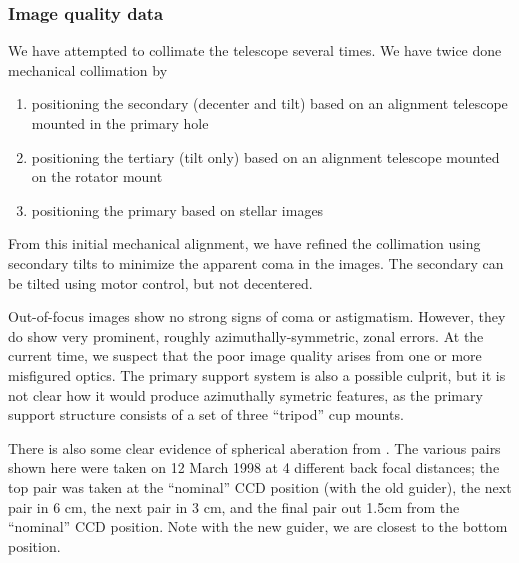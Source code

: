 \documentclass{article}[12pt]
\begin{document}
\subsubsection{Image quality data}

We have attempted to collimate the telescope several times. We have
twice done mechanical collimation by 
\begin{enumerate}
\item positioning the secondary (decenter and tilt) based on an alignment 
telescope mounted in the primary hole
\item positioning the tertiary (tilt only) based on an alignment telescope
mounted on the rotator mount
\item positioning the primary based on stellar images
\end{enumerate}

From this initial mechanical alignment, we have refined the collimation
using secondary tilts to minimize the apparent coma in the images. 
The secondary can be tilted using motor control, but not decentered.


Out-of-focus images show no strong signs of coma or astigmatism. However,
they do show very prominent, roughly azimuthally-symmetric, zonal
errors. At the current time, we suspect that the poor image quality
arises from one or more misfigured optics. The primary support system 
is also a possible culprit, but it is not clear how it would produce
azimuthally symetric features, as the primary support structure consists
of a set of three ``tripod'' cup mounts.

There is also some clear evidence of spherical aberation from 
. 
 The various
pairs shown here were taken on 12 March 1998 
at 4 different back focal distances; the
top pair was taken at the ``nominal'' CCD position (with the old guider),
the next pair in 6 cm, the next pair in 3 cm, and the final pair
out 1.5cm from the ``nominal'' CCD position. Note with the new guider,
we are closest to the bottom position.

\begin{latexonly}
\begin{figure}
\label{fig:980312pairs}
\end{figure}
\end{latexonly}
\end{document}
